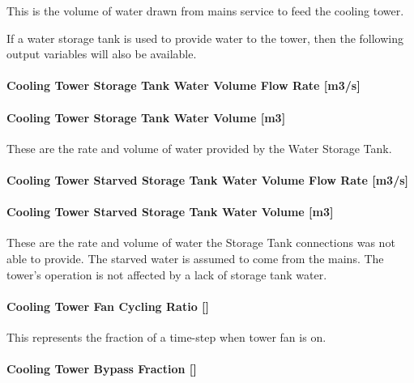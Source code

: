 This is the volume of water drawn from mains service to feed the cooling tower.

If a water storage tank is used to provide water to the tower, then the following output variables will also be available.

\paragraph{Cooling Tower Storage Tank Water Volume Flow Rate {[}m3/s{]}}\label{cooling-tower-storage-tank-water-volume-flow-rate-m3s}

\paragraph{Cooling Tower Storage Tank Water Volume {[}m3{]}}\label{cooling-tower-storage-tank-water-volume-m3}

These are the rate and volume of water provided by the Water Storage Tank.

\paragraph{Cooling Tower Starved Storage Tank Water Volume Flow Rate {[}m3/s{]}}\label{cooling-tower-starved-storage-tank-water-volume-flow-rate-m3s}

\paragraph{Cooling Tower Starved Storage Tank Water Volume {[}m3{]}}\label{cooling-tower-starved-storage-tank-water-volume-m3}

These are the rate and volume of water the Storage Tank connections was not able to provide. The starved water is assumed to come from the mains. The tower's operation is not affected by a lack of storage tank water.

\paragraph{Cooling Tower Fan Cycling Ratio {[]}}\label{cooling-tower-fan-cycling-ratio}

This represents the fraction of a time-step when tower fan is on.

\paragraph{Cooling Tower Bypass Fraction {[]}}\label{cooling-tower-bypass-fraction}


